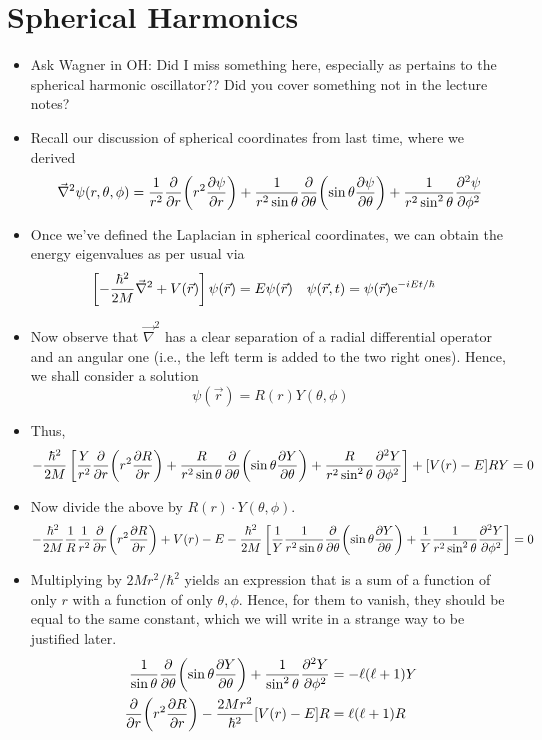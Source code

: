 \documentclass[../notes.tex]{subfiles}
\begin{document}
\section{Spherical Harmonics}
\begin{itemize}
    \item {}Ask Wagner in OH: Did I miss something here, especially as pertains to the spherical harmonic oscillator?? Did you cover something not in the lecture notes?
    \item Recall our discussion of spherical coordinates from last time, where we derived
    \begin{equation*}
        \vec{\nabla}^2\psi(r,\theta,\phi) = \frac{1}{r^2}\pdv{r}(r^2\pdv{\psi}{r})+\frac{1}{r^2\sin\theta}\pdv{\theta}(\sin\theta\pdv{\psi}{\theta})+\frac{1}{r^2\sin^2\theta}\pdv[2]{\psi}{\phi}
    \end{equation*}
    \item Once we've defined the Laplacian in spherical coordinates, we can obtain the energy eigenvalues as per usual via
    \begin{align*}
        \left[ -\frac{\hbar^2}{2M}\vec{\nabla}^2+V(\vec{r}) \right]\psi(\vec{r}) &= E\psi(\vec{r})&
        \psi(\vec{r},t) &= \psi(\vec{r})\e[-iEt/\hbar]
    \end{align*}
    \item Now observe that $\vec{\nabla}^2$ has a clear separation of a radial differential operator and an angular one (i.e., the left term is added to the two right ones). Hence, we shall consider a solution
    \begin{equation*}
        \psi(\vec{r}) = R(r)Y(\theta,\phi)
    \end{equation*}
    \item Thus,
    \begin{equation*}
        -\frac{\hbar^2}{2M}\left[ \frac{Y}{r^2}\pdv{r}(r^2\pdv{R}{r})+\frac{R}{r^2\sin\theta}\pdv{\theta}(\sin\theta\pdv{Y}{\theta})+\frac{R}{r^2\sin^2\theta}\pdv[2]{Y}{\phi} \right]+[V(r)-E]RY = 0
    \end{equation*}
    \item Now divide the above by $R(r)\cdot Y(\theta,\phi)$.
    \begin{equation*}
        -\frac{\hbar^2}{2M}\frac{1}{R}\frac{1}{r^2}\pdv{r}(r^2\pdv{R}{r})+V(r)-E-\frac{\hbar^2}{2M}\left[ \frac{1}{Y}\frac{1}{r^2\sin\theta}\pdv{\theta}(\sin\theta\pdv{Y}{\theta})+\frac{1}{Y}\frac{1}{r^2\sin^2\theta}\pdv[2]{Y}{\phi} \right] = 0
    \end{equation*}
    \item Multiplying by $2Mr^2/\hbar^2$ yields an expression that is a sum of a function of only $r$ with a function of only $\theta,\phi$. Hence, for them to vanish, they should be equal to the same constant, which we will write in a strange way to be justified later.
    \begin{align*}
        \frac{1}{\sin\theta}\pdv{\theta}(\sin\theta\pdv{Y}{\theta})+\frac{1}{\sin^2\theta}\pdv[2]{Y}{\phi} &= -\ell(\ell+1)Y\\
        \pdv{r}(r^2\pdv{R}{r})-\frac{2Mr^2}{\hbar^2}[V(r)-E]R &= \ell(\ell+1)R
    \end{align*}
\end{itemize}
\end{document}
